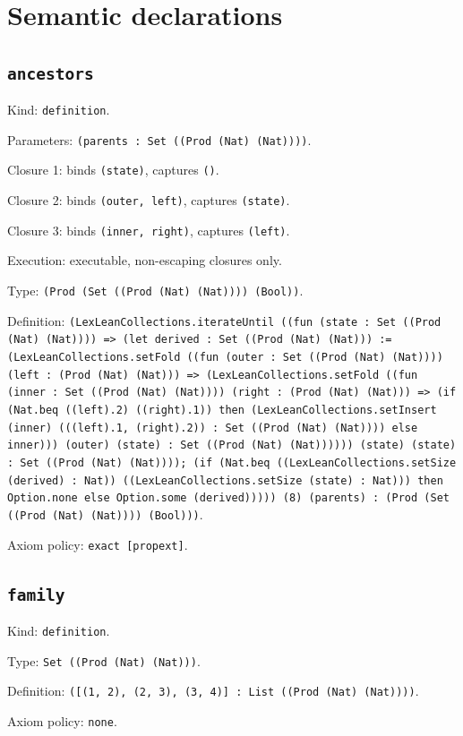 \documentclass[11pt]{article}
\begin{document}
\section*{Semantic declarations}
\subsection*{\texttt{ancestors}}
\noindent Kind: \texttt{definition}.\par
\noindent Parameters: \texttt{(parents : Set ((Prod (Nat) (Nat))))}.\par
\noindent Closure 1: binds \texttt{(state)}, captures \texttt{()}.\par
\noindent Closure 2: binds \texttt{(outer, left)}, captures \texttt{(state)}.\par
\noindent Closure 3: binds \texttt{(inner, right)}, captures \texttt{(left)}.\par
\noindent Execution: executable, non-escaping closures only.\par
\noindent Type: \texttt{(Prod (Set ((Prod (Nat) (Nat)))) (Bool))}.\par
\noindent Definition: \texttt{(LexLeanCollections.iterateUntil ((fun (state : Set ((Prod (Nat) (Nat)))) => (let derived : Set ((Prod (Nat) (Nat))) := (LexLeanCollections.setFold ((fun (outer : Set ((Prod (Nat) (Nat)))) (left : (Prod (Nat) (Nat))) => (LexLeanCollections.setFold ((fun (inner : Set ((Prod (Nat) (Nat)))) (right : (Prod (Nat) (Nat))) => (if (Nat.beq ((left).2) ((right).1)) then (LexLeanCollections.setInsert (inner) (((left).1, (right).2)) : Set ((Prod (Nat) (Nat)))) else inner))) (outer) (state) : Set ((Prod (Nat) (Nat)))))) (state) (state) : Set ((Prod (Nat) (Nat)))); (if (Nat.beq ((LexLeanCollections.setSize (derived) : Nat)) ((LexLeanCollections.setSize (state) : Nat))) then Option.none else Option.some (derived))))) (8) (parents) : (Prod (Set ((Prod (Nat) (Nat)))) (Bool)))}.\par
\noindent Axiom policy: \texttt{exact [propext]}.\par
\subsection*{\texttt{family}}
\noindent Kind: \texttt{definition}.\par
\noindent Type: \texttt{Set ((Prod (Nat) (Nat)))}.\par
\noindent Definition: \texttt{([(1, 2), (2, 3), (3, 4)] : List ((Prod (Nat) (Nat))))}.\par
\noindent Axiom policy: \texttt{none}.\par
\end{document}
